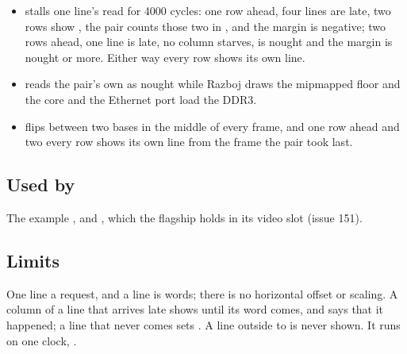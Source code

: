 \begin{itemize}
\begin{itemize}
 is set at , and the core's greeting comes
out whole.
\item {}
stalls one line's read for 4000 cycles: one row ahead, four lines are
late, two rows show , the pair counts those two in
, and the margin is negative; two rows ahead, one
line is late, no column starves,  is nought and the
margin is nought or more. Either way every row shows its own line.
\item {} reads the
pair's own  as nought while Razboj draws the
mipmapped floor and the core and the Ethernet port load the DDR3.
\item {}
flips between two bases in the middle of every frame, and one
row ahead and two every row shows its own line from the frame the pair
took last.
\end{itemize}
\end{itemize}

\subsection*{Used by}

The example , and , which the
flagship holds in its video slot (issue 151).

\subsection*{Limits}

One line a request, and a line is  words; there is no
horizontal offset or scaling. A column of a line that arrives late
shows  until its word comes, and  says that
it happened; a line that never comes sets . A line outside
 to  is never shown. It runs on one clock,
.
